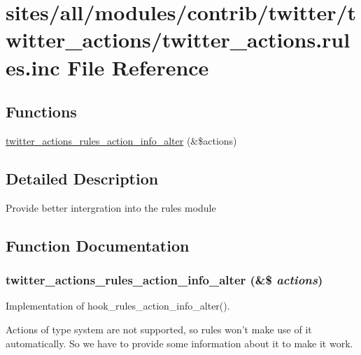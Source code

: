 \hypertarget{twitter__actions_8rules_8inc}{
\section{sites/all/modules/contrib/twitter/twitter\_\-actions/twitter\_\-actions.rules.inc File Reference}
\label{twitter__actions_8rules_8inc}
}
\subsection*{Functions}
\begin{CompactItemize}
\item 
\hyperlink{twitter__actions_8rules_8inc_768462b7e01711cb7230ae3e666f28cd}{twitter\_\-actions\_\-rules\_\-action\_\-info\_\-alter} (\&\$actions)
\end{CompactItemize}


\subsection{Detailed Description}
Provide better intergration into the rules module 

\subsection{Function Documentation}
\hypertarget{twitter__actions_8rules_8inc_768462b7e01711cb7230ae3e666f28cd}{
\subsubsection[{twitter\_\-actions\_\-rules\_\-action\_\-info\_\-alter}]{\setlength{\rightskip}{0pt plus 5cm}twitter\_\-actions\_\-rules\_\-action\_\-info\_\-alter (\&\$ {\em actions})}}
\label{twitter__actions_8rules_8inc_768462b7e01711cb7230ae3e666f28cd}


Implementation of hook\_\-rules\_\-action\_\-info\_\-alter().

Actions of type system are not supported, so rules won't make use of it automatically. So we have to provide some information about it to make it work. 